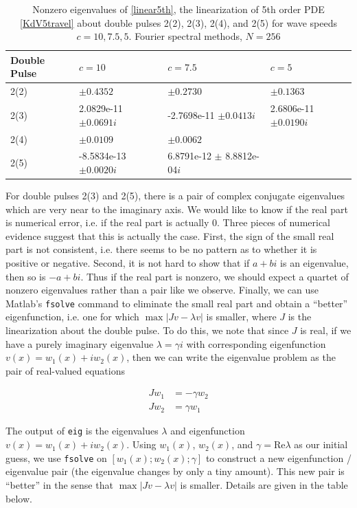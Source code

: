 \documentclass[12pt]{article}
\begin{document}
\begin{table}[H]
\begin{tabular}{l|lll}
 Double Pulse   & $c = 10$            & $c=7.5$                         & $c=5$        \\ \hline
  2(2) &     $\pm 0.4352$             & $\pm 0.2730$                    & $\pm 0.1363$ \\ 
  2(3) &     2.0829e-11 $\pm 0.0691i$ & -2.7698e-11 $\pm 0.0413i$       & 2.6806e-11 $\pm 0.0190i$\\ 
  2(4) &     $\pm 0.0109$             & $\pm 0.0062$                    & \\ 
  2(5) &    -8.5834e-13 $\pm 0.0020i$ & 6.8791e-12 $\pm$ 8.8812e-04$i$  & \\
\end{tabular}
\caption{Nonzero eigenvalues of \eqref{linear5th}, the linearization of 5th order PDE \eqref{KdV5travel} about double pulses 2(2), 2(3), 2(4), and 2(5) for wave speeds $c = 10, 7.5, 5$. Fourier spectral methods, $N = 256$}
\end{table}

For double pulses 2(3) and 2(5), there is a pair of complex conjugate eigenvalues which are very near to the imaginary axis. We would like to know if the real part is numerical error, i.e. if the real part is actually 0. Three pieces of numerical evidence suggest that this is actually the case. First, the sign of the small real part is not consistent, i.e. there seems to be no pattern as to whether it is positive or negative. Second, it is not hard to show that if $a + bi$ is an eigenvalue, then so is $-a + bi$. Thus if the real part is nonzero, we should expect a quartet of nonzero eigenvalues rather than a pair like we observe. Finally, we can use Matlab's \texttt{fsolve} command to eliminate the small real part and obtain a ``better'' eigenfunction, i.e. one for which $\max{|Jv - \lambda v|}$ is smaller, where $J$ is the linearization about the double pulse. To do this, we note that since $J$ is real, if we have a purely imaginary eigenvalue $\lambda = \gamma i$ with corresponding eigenfunction $v(x) = w_1(x) + i w_2(x)$, then we can write the eigenvalue problem as the pair of real-valued equations

\begin{align}\label{realeigproblem}
Jw_1 &= -\gamma w_2 \\
Jw_2 &= \gamma w_1
\end{align}

The output of \texttt{eig} is the eigenvalues $\lambda$ and eigenfunction $v(x) = w_1(x) + i w_2(x)$. Using $w_1(x)$, $w_2(x)$, and $\gamma = \textrm{Re} \lambda$ as our initial guess, we use \texttt{fsolve} on $[w_1(x); w_2(x); \gamma]$ to construct a new eigenfunction / eigenvalue pair (the eigenvalue changes by only a tiny amount). This new pair is ``better'' in the sense that $\max{|Jv - \lambda v|}$ is smaller. Details are given in the table below.
\end{document}
